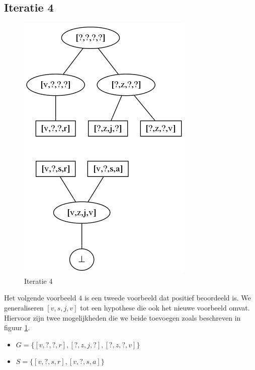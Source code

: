 \documentclass[alternative-exam.tex]{subfiles}
\begin{document}
\subsection{Iteratie 4}
\begin{figure}
[H]
\centering
\caption{Iteratie 4}
\label{iter_4}
\includegraphics[scale=0.5]{resources/graphs/iteration_4.png}
\end{figure}
Het volgende voorbeeld $4$ is een tweede voorbeeld dat positief beoordeeld is. We generaliseren $[v,s,j,v]$ tot een hypothese die ook het nieuwe voorbeeld omvat. Hiervoor zijn twee mogelijkheden die we beide toevoegen zoals beschreven in figuur \ref{iter_4}.
\begin{itemize}
\item $G = \{[v,?,?,r],[?,z,j,?],[?,z,?,v]\}$
\item $S = \{[v,?,s,r],[v,?,s,a]\}$
\end{itemize}
\end{document}
